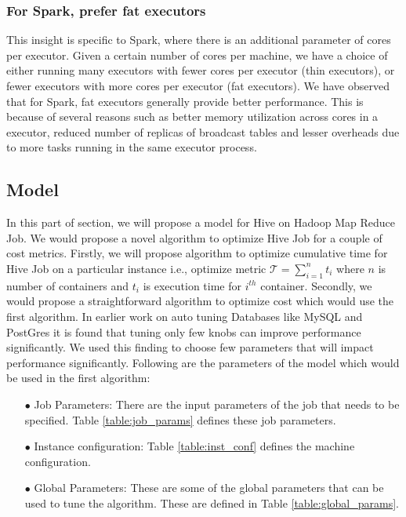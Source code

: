 {\noindent\subsubsection*{\bf For Spark, prefer fat executors}
This insight is specific to Spark, where there is an additional parameter of cores per executor. Given a certain number of cores per machine, we have a choice of either running many executors with fewer cores per executor (thin executors), or fewer executors with more cores per executor (fat executors). We have observed that for Spark, fat executors generally provide better performance. This is because of several reasons such as  better memory utilization across cores in a executor, reduced number of replicas of broadcast tables and lesser overheads due to more tasks running in the same executor process.
}

\subsection{Model}

In this part of section, we will propose a model for Hive on Hadoop Map Reduce Job. We would propose a novel algorithm to optimize Hive Job for a couple of cost metrics. Firstly, we will propose algorithm to optimize cumulative time for Hive Job on a particular instance i.e., optimize metric $\mathcal{T} = \sum_{i=1}^{n} t_i$ where $n$ is number of containers and $t_i$ is execution time for $i^{th}$ container. Secondly, we would propose a straightforward algorithm to optimize cost which would use the first algorithm. In earlier work \cite{VanKen} on auto tuning Databases like MySQL and PostGres it is found that tuning only few knobs can improve performance significantly. We used this finding to choose few parameters that will impact performance significantly.
Following are the parameters of the model which would be used in the first algorithm:
\begin{enumerate}
    \item[$\bullet$] Job Parameters: There are the input parameters of the job that needs to be specified. Table \ref{table:job_params} defines these job parameters.
    \item[$\bullet$] Instance configuration: Table \ref{table:inst_conf} defines the machine configuration.
    \item[$\bullet$] Global Parameters: These are some of the global parameters that can be used to tune the algorithm. These are defined in Table \ref{table:global_params}.
\end{enumerate}

